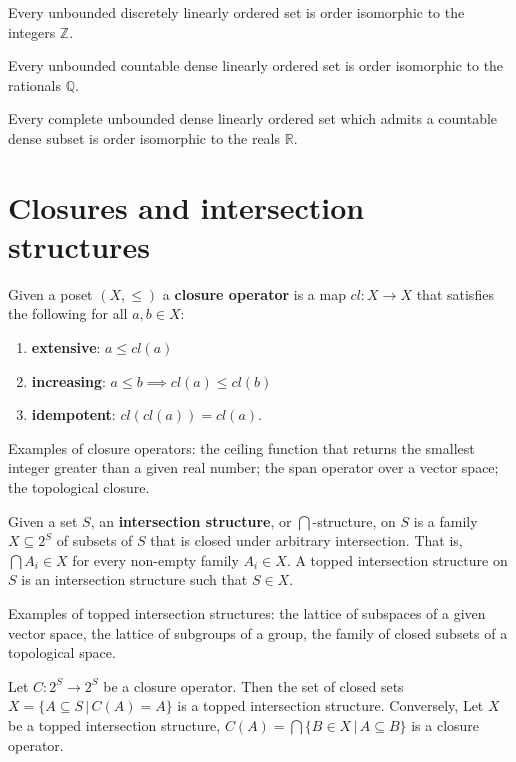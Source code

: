 \documentclass{article}
\begin{document}
\begin{prop}
	Every unbounded discretely linearly ordered set is order isomorphic to the integers $\mathbb{Z}$.
\end{prop}

\begin{prop}
	 Every unbounded countable dense linearly ordered set is order isomorphic to the rationals $\mathbb{Q}$.
\end{prop}

\begin{prop}
	Every complete unbounded dense linearly ordered set which admits a countable dense subset is order isomorphic to the reals $\mathbb{R}$.
\end{prop}

\section{Closures and intersection structures}

\begin{defn}
	Given a poset $(X, \leq)$ a \textbf{closure operator} is a map $cl : X \to X$ that satisfies the following for all $a,b \in X$:
	\begin{enumerate}
		\item \textbf{extensive}: $a \leq cl(a)$
		\item \textbf{increasing}: $a \leq b \implies cl(a) \leq cl(b)$
		\item \textbf{idempotent}: $cl(cl(a)) = cl(a)$.
	\end{enumerate}
\end{defn}

Examples of closure operators: the ceiling function that returns the smallest integer greater than a given real number; the span operator over a vector space; the topological closure.

\begin{defn}
	Given a set $S$, an \textbf{intersection structure}, or $\bigcap$-structure, on $S$ is a family $X \subseteq 2^{S}$ of subsets of $S$ that is closed under arbitrary intersection. That is, $\bigcap A_i \in X$ for every non-empty family $A_i \in X$. A topped intersection structure on $S$ is an intersection structure such that $S \in X$.
\end{defn}

Examples of topped intersection structures: the lattice of subspaces of a given vector space, the lattice of subgroups of a group, the family of closed subsets of a topological space.

\begin{prop}
	Let $C : 2^{S} \to 2^{S}$ be a closure operator. Then the set of closed sets $X = \{ A \subseteq S \, | \, C(A) = A\}$ is a topped intersection structure. Conversely, Let $X$ be a topped intersection structure, $C(A) = \bigcap \{B \in X \, | \, A \subseteq B \}$ is a closure operator.
\end{prop}



\end{document}
